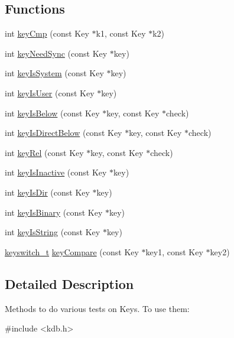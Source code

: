 \subsection*{Functions}
\begin{DoxyCompactItemize}
\item 
int \hyperlink{group__keytest_gaf6e66e12fe04d535a5d1c8218ced803e}{key\-Cmp} (const Key $\ast$k1, const Key $\ast$k2)
\item 
int \hyperlink{group__keytest_gaf247df0de7aca04b32ef80e39ef12950}{key\-Need\-Sync} (const Key $\ast$key)
\item 
int \hyperlink{group__keytest_gafe49cfb61c2accb3073131c23a56fb14}{key\-Is\-System} (const Key $\ast$key)
\item 
int \hyperlink{group__keytest_ga373acc20c6209357045891f4b0c70041}{key\-Is\-User} (const Key $\ast$key)
\item 
int \hyperlink{group__keytest_ga03332b5d97c76a4fd2640aca4762b8df}{key\-Is\-Below} (const Key $\ast$key, const Key $\ast$check)
\item 
int \hyperlink{group__keytest_ga4f175aafd98948ce6c774f3bd92b72ca}{key\-Is\-Direct\-Below} (const Key $\ast$key, const Key $\ast$check)
\item 
int \hyperlink{group__keytest_ga6bb0f95ac34ce9c42d61bb35a76139d0}{key\-Rel} (const Key $\ast$key, const Key $\ast$check)
\item 
int \hyperlink{group__keytest_gaa25f699f592031c1a0abc1504d14e13e}{key\-Is\-Inactive} (const Key $\ast$key)
\item 
int \hyperlink{group__keytest_gac0a10c602d52a35f81347e8a32312017}{key\-Is\-Dir} (const Key $\ast$key)
\item 
int \hyperlink{group__keytest_ga9526b371087564e43e3dff8ad0dac949}{key\-Is\-Binary} (const Key $\ast$key)
\item 
int \hyperlink{group__keytest_gaea7670778abd07fee0fe8ac12a149190}{key\-Is\-String} (const Key $\ast$key)
\item 
\hyperlink{group__key_ga91fb3178848bd682000958089abbaf40}{keyswitch\-\_\-t} \hyperlink{group__keytest_gab98168409d302fdb65692f6e26f17945}{key\-Compare} (const Key $\ast$key1, const Key $\ast$key2)
\end{DoxyCompactItemize}


\subsection{Detailed Description}
Methods to do various tests on Keys. To use them\-: 
\begin{DoxyCode}
\textcolor{preprocessor}{#include <kdb.h>}
\end{DoxyCode}
 

